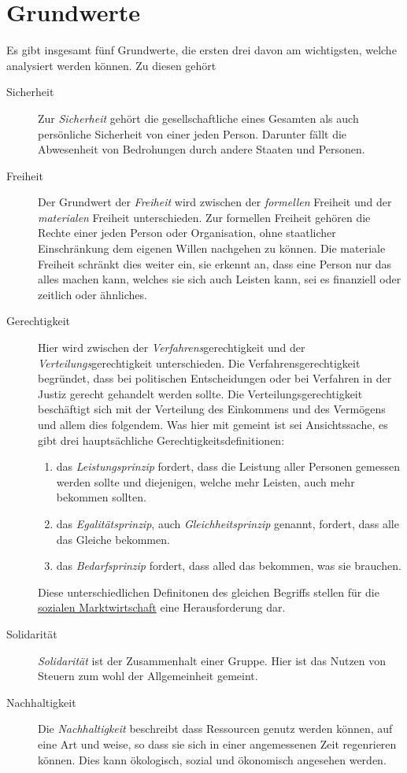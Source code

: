 \documentclass{article}
\begin{document}
\section{Grundwerte}
Es gibt insgesamt fünf Grundwerte, die ersten drei davon am wichtigsten, welche analysiert werden können. Zu diesen gehört
\begin{description}
 \item[Sicherheit] Zur \emph{Sicherheit} gehört die gesellschaftliche eines Gesamten als auch persönliche Sicherheit von einer jeden Person. Darunter fällt die Abwesenheit von Bedrohungen durch andere Staaten und Personen.
 \item[Freiheit] Der Grundwert der \emph{Freiheit} wird zwischen der \emph{formellen} Freiheit und der \emph{materialen} Freiheit unterschieden. Zur formellen Freiheit gehören die Rechte einer jeden Person oder Organisation, ohne staatlicher Einschränkung dem eigenen Willen nachgehen zu können. Die materiale Freiheit schränkt dies weiter ein, sie erkennt an, dass eine Person nur das alles machen kann, welches sie sich auch Leisten kann, sei es finanziell oder zeitlich oder ähnliches.
 \item[Gerechtigkeit] Hier wird zwischen der \emph{Verfahrens}gerechtigkeit und der \emph{Verteilungs}gerechtigkeit unterschieden. Die Verfahrensgerechtigkeit begründet, dass bei politischen Entscheidungen oder bei Verfahren in der Justiz gerecht gehandelt werden sollte. Die Verteilungsgerechtigkeit beschäftigt sich mit der Verteilung des Einkommens und des Vermögens und allem dies folgendem. Was hier mit  gemeint ist sei Ansichtssache, es gibt drei hauptsächliche Gerechtigkeitsdefinitionen:
 \begin{enumerate}
  \item das \emph{Leistungsprinzip} fordert, dass die Leistung aller Personen gemessen werden sollte und diejenigen, welche mehr Leisten, auch mehr bekommen sollten.
  \item das \emph{Egalitätsprinzip}, auch \emph{Gleichheitsprinzip} genannt, fordert, dass alle das Gleiche bekommen.
  \item das \emph{Bedarfsprinzip} fordert, dass alled das bekommen, was sie brauchen.
 \end{enumerate}
Diese unterschiedlichen Definitonen des gleichen Begriffs stellen für die \hyperref[Soziale Marktwirtschaft]{sozialen Marktwirtschaft} eine Herausforderung dar.
 \item[Solidarität] \emph{Solidarität} ist der Zusammenhalt einer Gruppe. Hier ist das Nutzen von Steuern zum wohl der Allgemeinheit gemeint.
 \item[Nachhaltigkeit] Die \emph{Nachhaltigkeit} beschreibt dass Ressourcen genutz werden können, auf eine Art und weise, so dass sie sich in einer angemessenen Zeit regenrieren können. Dies kann ökologisch, sozial und ökonomisch angesehen werden.  
\end{description} 
\end{document}
